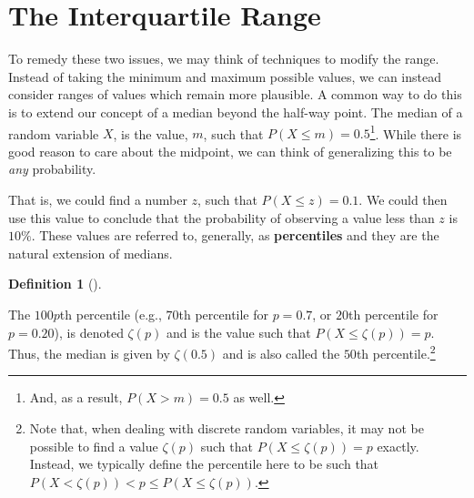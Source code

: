 \documentclass[
  letterpaper,
  DIV=11,
  numbers=noendperiod]{scrreprt}
\theoremstyle{definition}
\theoremstyle{definition}
\theoremstyle{definition}
\newtheorem{definition}{Definition}[chapter]
\theoremstyle{remark}
\begin{document}
\section{The Interquartile Range}\label{the-interquartile-range}

To remedy these two issues, we may think of techniques to modify the
range. Instead of taking the minimum and maximum possible values, we can
instead consider ranges of values which remain more plausible. A common
way to do this is to extend our concept of a median beyond the half-way
point. The median of a random variable \(X\), is the value, \(m\), such
that \(P(X \leq m) = 0.5\)\footnote{And, as a result, \(P(X > m) = 0.5\)
  as well.}. While there is good reason to care about the midpoint, we
can think of generalizing this to be \emph{any} probability.

That is, we could find a number \(z\), such that \(P(X \leq z) = 0.1\).
We could then use this value to conclude that the probability of
observing a value less than \(z\) is \(10\%\). These values are referred
to, generally, as \textbf{percentiles} and they are the natural
extension of medians.

\begin{definition}[]\protect\hypertarget{def-percentile}{}\label{def-percentile}

The \(100p\)th percentile (e.g., \(70\)th percentile for \(p=0.7\), or
\(20\)th percentile for \(p=0.20\)), is denoted \(\zeta(p)\) and is the
value such that \(P(X \leq \zeta(p)) = p\). Thus, the median is given by
\(\zeta(0.5)\) and is also called the \(50\)th percentile.\footnote{Note
  that, when dealing with discrete random variables, it may not be
  possible to find a value \(\zeta(p)\) such that
  \(P(X \leq \zeta(p)) = p\) exactly. Instead, we typically define the
  percentile here to be such that
  \(P(X < \zeta(p)) < p \leq P(X \leq \zeta(p))\).}

\end{definition}
\end{document}
